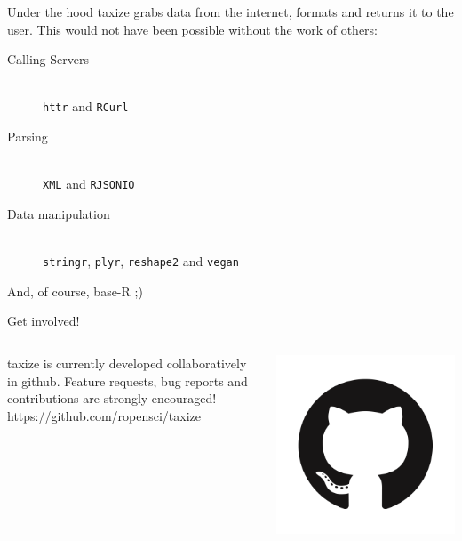 \documentclass[final,t]{beamer}\usepackage[]{graphicx}\usepackage[]{color}
\begin{document}
\begin{frame}[fragile]
\begin{columns}[t]
\begin{column}{.49\linewidth}
      \begin{block}{Under the hood}
      taxize grabs data from the internet, formats and returns it to the user.
      This would not have been possible without the work of others:
      \begin{description}
        \item[Calling Servers] \hfill \\
          \texttt{httr} and \texttt{RCurl}
        \item[Parsing] \hfill \\
          \texttt{XML} and \texttt{RJSONIO}
        \item[Data manipulation] \hfill \\
          \texttt{stringr}, \texttt{plyr}, \texttt{reshape2} and \texttt{vegan}
      \end{description}
      \vspace{0.5cm}
      And, of course, base-R ;)
      
      \end{block}
      
			\begin{block}{Get involved!}
				\begin{columns}[T]
					\begin{column}{.78\linewidth}
						taxize is currently developed collaboratively in github. Feature requests, bug reports and contributions are strongly encouraged! \\[0.5em]
						\huge \Mundus \normalsize \hspace{0.5cm} https://github.com/ropensci/taxize
					\end{column}
					\begin{column}{.2\linewidth}
						\includegraphics[width=0.85\linewidth]{fig/github.png}
					\end{column}
				\end{columns}
			\end{block}
		\end{column}
	\end{columns}
\end{frame}
\end{document}
